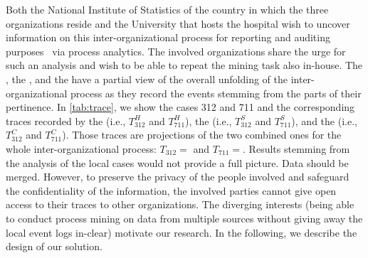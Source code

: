 Both the National Institute of Statistics of the country in which the three organizations reside and the University that hosts the hospital wish to uncover information on this inter-organizational process for reporting and auditing purposes~\cite{Jans.Hosseinpour/IJAIS2019:ActiveLearningProcessMiningForAuditing} via process analytics. The involved organizations share the urge for such an analysis and wish to be able to repeat the mining task also in-house. 
The , the , and the  have a partial view of the overall unfolding of the inter-organizational process as they record the events stemming from the parts of their pertinence. %
In \cref{tab:trace}, we show the cases 312 and 711 and the corresponding traces recorded by the  (i.e., $T^H_{312}$ and $T^H_{711}$), the  (i.e., $T^S_{312}$ and $T^S_{711}$), and the  (i.e., $T^C_{312}$ and $T^C_{711}$).
Those traces are projections of the two combined ones for the whole inter-organizational process: $T_{312}=$\textlangle{}{\TaliceUncolored}\textrangle{} and $T_{711}=$\textlangle{}{\TbobUncolored}\textrangle{}. %
Results stemming from the analysis of the local cases would not provide a full picture. Data should be merged. However, to preserve the privacy of the people involved and safeguard the confidentiality of the information, the involved parties cannot give open access to their traces to other organizations. The diverging interests (being able to conduct process mining on data from multiple sources without giving away the local event logs in-clear) motivate our research. In the following, we describe the design of our solution.